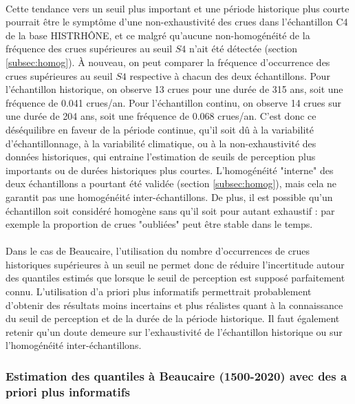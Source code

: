 	\paragraph{} Cette tendance vers un seuil plus important et une période historique plus courte pourrait être le symptôme d'une non-exhaustivité des crues dans l'échantillon C4 de la base HISTRHÔNE, et ce malgré qu'aucune non-homogénéité de la fréquence des crues supérieures au seuil $S4$ n'ait été détectée (section \ref{subsec:homog}). À nouveau, on peut comparer la fréquence d'occurrence des crues supérieures au seuil $S4$ respective à chacun des deux échantillons. Pour l'échantillon historique, on observe 13 crues pour une durée de 315 ans, soit une fréquence de 0.041 crues/an. Pour l'échantillon continu, on observe 14 crues sur une durée de 204 ans, soit une fréquence de 0.068 crues/an. C'est donc ce déséquilibre en faveur de la période continue, qu'il soit dû à la variabilité d'échantillonnage, à la variabilité climatique, ou à la non-exhaustivité des données historiques, qui entraine l'estimation de seuils de perception plus importants ou de durées historiques plus courtes. L'homogénéité "interne" des deux échantillons a pourtant été validée (section \ref{subsec:homog}), mais cela ne garantit pas une homogénéité inter-échantillons. De plus, il est possible qu'un échantillon soit considéré homogène sans qu'il soit pour autant exhaustif : par exemple la proportion de crues "oubliées" peut être stable dans le temps.
	
	
	\paragraph{} Dans le cas de Beaucaire, l'utilisation du nombre d'occurrences de crues historiques supérieures à un seuil ne permet donc de réduire l'incertitude autour des quantiles estimés que lorsque le seuil de perception est supposé parfaitement connu. L'utilisation d'a priori plus informatifs permettrait probablement d'obtenir des résultats moins incertains et plus réalistes quant à la connaissance du seuil de perception et de la durée de la période historique. Il faut également retenir qu'un doute demeure sur l'exhaustivité de l'échantillon historique ou sur l'homogénéité inter-échantillons.
	 
	 \subsubsection{Estimation des quantiles à Beaucaire (1500-2020) avec des a priori plus informatifs}
	 \label{subsec:D*}

